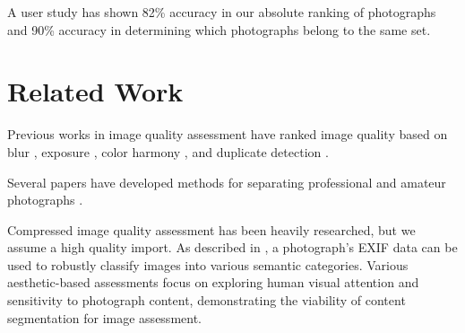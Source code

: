 \documentclass[10pt,twocolumn,letterpaper]{article}
\begin{document}
A user study has shown 82\% accuracy in our absolute ranking of photographs and 90\% accuracy in determining which photographs belong to the same set.

\section{Related Work}


Previous works in image quality assessment have ranked image quality based on blur \cite{springerlink:10.1007/978-3-540-77409-9_26}, exposure \cite{5540170}, color harmony \cite{COL:COL5080160410}\cite{COL:COL10004}, and duplicate detection \cite{Chu2010256}. %

Several papers have developed methods for separating professional and amateur photographs \cite{springerlink:10.1007/978-3-540-30541-5_25}\cite{springerlink:10.1007/11744078_23}\cite{1640788}\cite{springerlink:10.1007/978-3-540-88690-7_29}. %


Compressed image quality assessment has been heavily researched\cite{477498}\cite{1038064}\cite{1284395}, but we assume a high quality import. As described in \cite{1315222}, a photograph's EXIF data can be used to robustly classify images into various semantic categories. Various aesthetic-based assessments focus on exploring human visual attention and sensitivity to photograph content\cite{Sun:2009:PAB:1631272.1631351}\cite{1518955}\cite{Pimenov_fastimage}, demonstrating the viability of content segmentation for image assessment.
\end{document}
